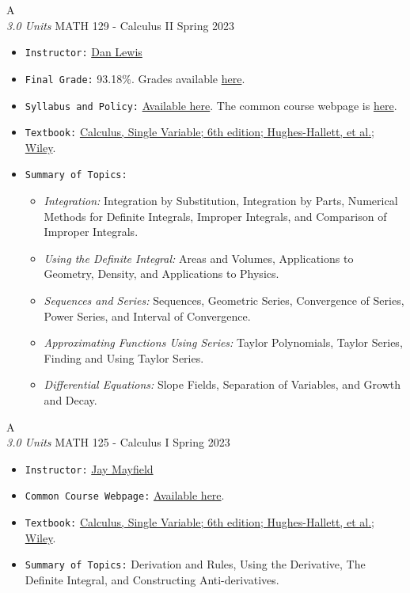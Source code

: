 \cventry
{A \\ \small{\textit{3.0 Units}}}
{MATH 129 - Calculus II}
{Spring 2023}
{}
{}
{
  \begin{itemize}
    \item \texttt{Instructor:} \href{https://www.math.arizona.edu/people/dlewis3}{Dan Lewis}
    \item \texttt{Final Grade:} 93.18\%. Grades available \href{https://mhrezaei.com/assets/cv/courses/Spring2023/MATH129/Grades.pdf}{here}.
    \item \texttt{Syllabus and Policy:} \href{https://mhrezaei.com/assets/cv/courses/Spring2023/MATH129/Syllabus.pdf}{Available here}. The common course webpage is \href{https://calculus.math.arizona.edu/math129}{here}.
    \item \texttt{Textbook:} \href{}{Calculus, Single Variable; 6th edition; Hughes-Hallett, et al.; Wiley}.
    \item \texttt{Summary of Topics:}
      \begin{itemize}
        \item \textit{Integration:} Integration by Substitution, Integration by Parts, Numerical Methods for Definite Integrals, Improper Integrals, and Comparison of Improper Integrals.
        \item \textit{Using the Definite Integral:} Areas and Volumes, Applications to Geometry, Density, and Applications to Physics.
        \item \textit{Sequences and Series:} Sequences, Geometric Series, Convergence of Series, Power Series, and Interval of Convergence.
        \item \textit{Approximating Functions Using Series:} Taylor Polynomials, Taylor Series, Finding and Using Taylor Series.
        \item \textit{Differential Equations:} Slope Fields, Separation of Variables, and Growth and Decay.
      \end{itemize}
  \end{itemize}
}

\cventry
{A \\ \small{\textit{3.0 Units}}}
{MATH 125 - Calculus I}
{Spring 2023}
{}
{}
{
  \begin{itemize}
    \item \texttt{Instructor:} \href{https://www.math.arizona.edu/people/jaymayfield}{Jay Mayfield}
    \item \texttt{Common Course Webpage:} \href{https://calculus.math.arizona.edu/calc1/math125}{Available here}.
    \item \texttt{Textbook:} \href{}{Calculus, Single Variable; 6th edition; Hughes-Hallett, et al.; Wiley}.
    \item \texttt{Summary of Topics:} Derivation and Rules, Using the Derivative, The Definite Integral, and Constructing Anti-derivatives.
  \end{itemize}
}
